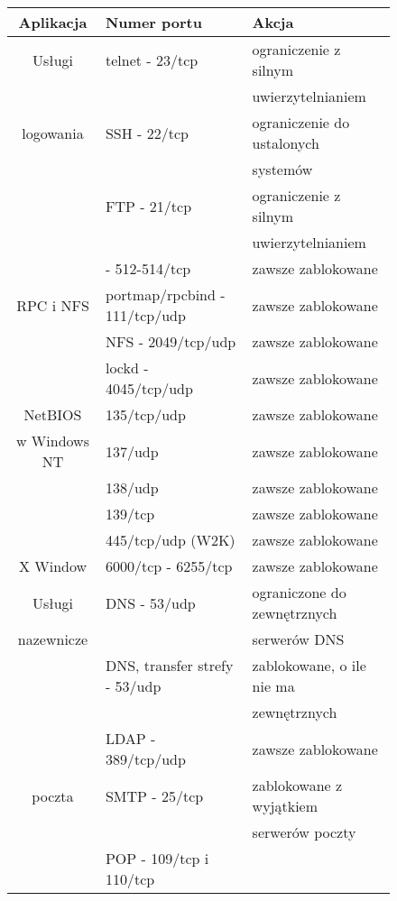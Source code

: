 \begin{figure*}
\begin{small}
\begin{center}
\noindent
\begin{tabular}{|c|l|l|} \hline
\bf{Aplikacja} & \bf{Numer portu} & \bf{Akcja} \\ \hline
\hline
Usługi & telnet - 23/tcp &
    ograniczenie z silnym \\
 & & uwierzytelnianiem\\ \cline{2 - 3}
logowania  & SSH - 22/tcp &
    ograniczenie do ustalonych \\
 & & systemów\\ \cline{2 - 3}
 & FTP - 21/tcp &
    ograniczenie z silnym \\
 & & uwierzytelnianiem\\ \cline{2 - 3}
 & \e{r-usługi} - 512-514/tcp &
    zawsze zablokowane\\ \hline
\hline
RPC i NFS & portmap/rpcbind - 111/tcp/udp  &
    zawsze zablokowane\\ \cline{2 - 3}
 & NFS - 2049/tcp/udp  &
    zawsze zablokowane\\ \cline{2 - 3}
 & lockd - 4045/tcp/udp  &
    zawsze zablokowane\\ \hline
\hline
NetBIOS & 135/tcp/udp  &
    zawsze zablokowane\\ \cline{2 - 3}
w Windows NT & 137/udp  &
    zawsze zablokowane\\ \cline{2 - 3}
 & 138/udp  &
    zawsze zablokowane\\ \cline{2 - 3}
 & 139/tcp  &
    zawsze zablokowane\\ \cline{2 - 3}
 & 445/tcp/udp (W2K) &
    zawsze zablokowane\\ \hline
\hline
X Window & 6000/tcp - 6255/tcp  &
    zawsze zablokowane\\ \hline
\hline
Usługi & DNS - 53/udp  &
    ograniczone do zewnętrznych \\
nazewnicze & & serwerów DNS \\ \cline{2 - 3}
 & DNS, transfer strefy - 53/udp  &
    zablokowane, o ile nie ma \\
 & & zewnętrznych \e{slave}\\ \cline{2 - 3}
 & LDAP - 389/tcp/udp  &
    zawsze zablokowane\\ \hline
\hline
poczta & SMTP - 25/tcp  &
    zablokowane z wyjątkiem \\
 & & serwerów poczty \\ \cline{2 - 3}
 & POP - 109/tcp i 110/tcp  &

\end{tabular}
\end{center}
\end{small}
\end{figure*}
